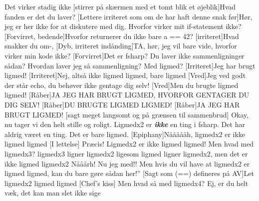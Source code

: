 \documentclass{article}
\begin{document}
\begin{sketch}
 Det virker stadig ikke
[stirrer på skærmen med et tomt blik et øjeblik]Hvad fanden er det du laver?
[Lettere irriteret som om de har haft denne snak før]Hør, jeg er her ikke for at diskutere med dig. Hvorfor virker mit if-statement ikke?
[Forvirret, bedende]Hvorfor returnerer du ikke bare a == 42?
[irriteret]Hvad snakker du om-,
[Dyb, irriteret indånding]TA, hør, jeg vil bare vide, hvorfor virker min kode ikke?
[Forvirret]Det er fsharp? Du laver ikke sammenligninger sådan?
Hvordan laver jeg så sammenligning?
Med ligmed?
[Irriteret]Jeg har brugt ligmed!
[Irriteret]Nej, altså ikke ligmed ligmed, bare ligmed
[Vred]Jeg ved godt der står echo, du behøver ikke gentage dig selv!
[Vred]Men du brugte ligmed ligmed!
[Råber]JA JEG HAR BRUGT LIGMED, HVORFOR GENTAGER DU DIG SELV!
[Råber]DU BRUGTE LIGMED LIGMED!
[Råber]JA JEG HAR BRUGT LIGMED!
[sagt meget langsomt og på grænsen til sammenbrud] Okay, nu tager vi den helt stille og roligt. Ligmedx2 er \textbf{\textit{ikke}} en ting i fsharp. Det har aldrig været en ting. Det er bare ligmed.
[Epiphany]Nåååååh, ligmedx2 er ikke ligmed ligmed
[I lettelse] Præcis! Ligmedx2 er ikke ligmed ligmed!
 Men hvad med ligmedx3?
 ligmedx3 ligner ligmedx2 ligesom ligmed ligner ligmedx2, men det er ikke ligmed ligmedx2
Nååårh! Nu jeg med!!
Men hvis du vil have at ligmedx2 er ligmed ligmed, kan du bare gøre sådan her!”
[Sagt som (==) defineres på AV]Let ligmedx2 ligmed ligmed
[Chef's kiss] Men hvad så med ligmedx4?
Ej, er du helt væk, det kan man slet ikke sige

\end{sketch}
\end{document}
